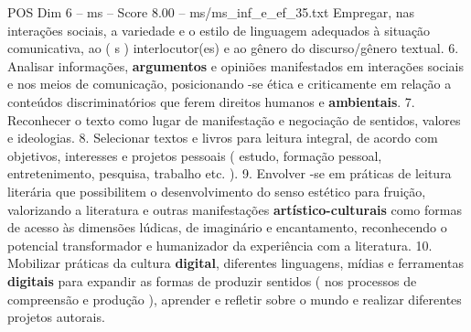 \begin{textsample}{POS Dim 6 – ms – Score 8.00 – ms/ms\_inf\_e\_ef\_35.txt}
Empregar, nas interações sociais, a variedade e o estilo de linguagem adequados à situação comunicativa, ao ( s ) interlocutor(es) e ao gênero do discurso/gênero textual. 6.
Analisar informações, \textbf{argumentos} e opiniões manifestados em interações sociais e nos meios de comunicação, posicionando -se ética e criticamente em relação a conteúdos discriminatórios que ferem direitos humanos e \textbf{ambientais}. 7.
Reconhecer o texto como lugar de manifestação e negociação de sentidos, valores e ideologias. 8.
Selecionar textos e livros para leitura integral, de acordo com objetivos, interesses e projetos pessoais ( estudo, formação pessoal, entretenimento, pesquisa, trabalho etc. ). 9.
Envolver -se em práticas de leitura literária que possibilitem o desenvolvimento do senso estético para fruição, valorizando a literatura e outras manifestações \textbf{artístico-culturais} como formas de acesso às dimensões lúdicas, de imaginário e encantamento, reconhecendo o potencial transformador e humanizador da experiência com a literatura. 10.
Mobilizar práticas da cultura \textbf{digital}, diferentes linguagens, mídias e ferramentas \textbf{digitais} para expandir as formas de produzir sentidos ( nos processos de compreensão e produção ), aprender e refletir sobre o mundo e realizar diferentes projetos autorais.

\end{textsample}
